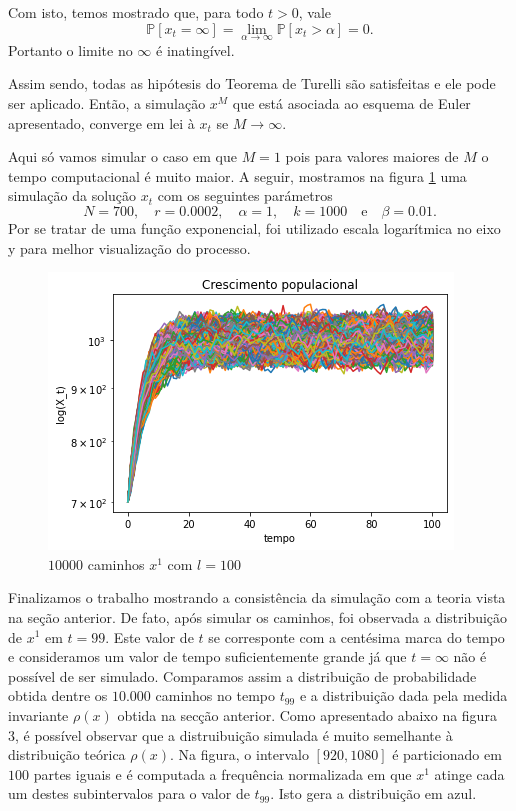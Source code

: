 \documentclass[12pt]{article}
\begin{document}
Com isto, temos mostrado que, para todo $t>0$, vale 
\[
\mathbb{P}[x_t=\infty]=\lim_{\alpha\rightarrow \infty}\mathbb{P}[x_t>\alpha]=0.
\]
Portanto o limite no $\infty$ é inatingível. 


Assim sendo, todas as hipótesis do Teorema de Turelli são satisfeitas e ele pode ser aplicado. Então, a simulação   $x^M$ que está asociada ao esquema de Euler apresentado, converge em lei à $x_t$ se $M \rightarrow \infty$. 


Aqui só vamos simular o caso em que $M=1$ pois para valores maiores de $M$ o tempo computacional é muito maior. A seguir, mostramos na figura \ref{fig:xt} uma simulação da solução $x_t$ com os seguintes parámetros
\[N=700 ,\quad r=0.0002 ,\quad\alpha=1 , \quad k=1000 \quad\textrm{e}\quad\beta=0.01 .\] Por se tratar de uma função exponencial, foi utilizado escala logarítmica no eixo y para melhor visualização do processo.

\begin{figure}[H]
 \centering
 \includegraphics[width=1.0\linewidth]{xt.png}
 \caption{$10000$ caminhos $x^1$ com $l=100$}
 \label{fig:xt}
\end{figure}



Finalizamos o trabalho mostrando a consistência da simulação com a teoria vista na seção anterior. De fato, após simular os caminhos,  foi observada a distribuição de $x^1$ em $t={99}$. Este valor de $t$ se corresponte com a centésima marca do tempo e consideramos um  valor de tempo suficientemente grande já que $t=\infty$ não é possível de ser simulado. Comparamos assim a distribuição de probabilidade obtida dentre os $10.000$ caminhos no tempo $t_{99}$ e a distribuição dada pela medida invariante $\rho(x)$ obtida na secção anterior. Como apresentado abaixo na figura 3, é possível observar que a distruibuição simulada é muito semelhante à distribuição teórica $\rho(x)$. Na figura, o intervalo $[920,1080]$ é particionado em $100$ partes iguais e é computada a frequência normalizada em que $x^1$ atinge cada um destes subintervalos para o valor de $t_{99}$. Isto gera a distribuição em azul.
 
\end{document}
